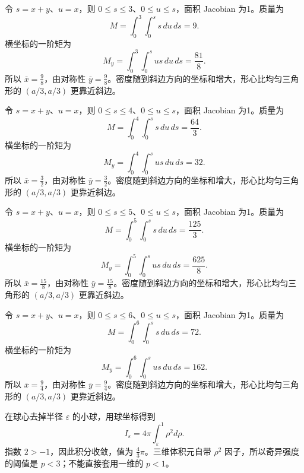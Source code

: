 \documentclass[12pt,fontset=fandol]{ctexart}
\begin{document}
\begin{solve}\label{ans:c40q9}
令 $s=x+y$、$u=x$，则 $0\le s\le 3$、$0\le u\le s$，面积 Jacobian 为1。质量为
\[
M=\int_0^{3}\int_0^s s\,du\,ds=9.
\]
横坐标的一阶矩为
\[
M_y=\int_0^{3}\int_0^s us\,du\,ds=\frac{81}{8}.
\]
所以 $\bar x=\frac{9}{8}$，由对称性 $\bar y=\frac{9}{8}$。密度随到斜边方向的坐标和增大，形心比均匀三角形的 $(a/3,a/3)$ 更靠近斜边。
\end{solve}

\begin{solve}\label{ans:c40q10}
令 $s=x+y$、$u=x$，则 $0\le s\le 4$、$0\le u\le s$，面积 Jacobian 为1。质量为
\[
M=\int_0^{4}\int_0^s s\,du\,ds=\frac{64}{3}.
\]
横坐标的一阶矩为
\[
M_y=\int_0^{4}\int_0^s us\,du\,ds=32.
\]
所以 $\bar x=\frac{3}{2}$，由对称性 $\bar y=\frac{3}{2}$。密度随到斜边方向的坐标和增大，形心比均匀三角形的 $(a/3,a/3)$ 更靠近斜边。
\end{solve}

\begin{solve}\label{ans:c40q11}
令 $s=x+y$、$u=x$，则 $0\le s\le 5$、$0\le u\le s$，面积 Jacobian 为1。质量为
\[
M=\int_0^{5}\int_0^s s\,du\,ds=\frac{125}{3}.
\]
横坐标的一阶矩为
\[
M_y=\int_0^{5}\int_0^s us\,du\,ds=\frac{625}{8}.
\]
所以 $\bar x=\frac{15}{8}$，由对称性 $\bar y=\frac{15}{8}$。密度随到斜边方向的坐标和增大，形心比均匀三角形的 $(a/3,a/3)$ 更靠近斜边。
\end{solve}

\begin{solve}\label{ans:c40q12}
令 $s=x+y$、$u=x$，则 $0\le s\le 6$、$0\le u\le s$，面积 Jacobian 为1。质量为
\[
M=\int_0^{6}\int_0^s s\,du\,ds=72.
\]
横坐标的一阶矩为
\[
M_y=\int_0^{6}\int_0^s us\,du\,ds=162.
\]
所以 $\bar x=\frac{9}{4}$，由对称性 $\bar y=\frac{9}{4}$。密度随到斜边方向的坐标和增大，形心比均匀三角形的 $(a/3,a/3)$ 更靠近斜边。
\end{solve}

\begin{solve}\label{ans:c40q13}
在球心去掉半径 $\varepsilon$ 的小球，用球坐标得到
\[
I_\varepsilon=4\pi\int_\varepsilon^1\rho^{2}d\rho.
\]
指数 $2>-1$，因此积分收敛，值为 $\frac{4}{3}\pi$。三维体积元自带 $\rho^2$ 因子，所以奇异强度的阈值是 $p<3$；不能直接套用一维的 $p<1$。
\end{solve}
\end{document}
